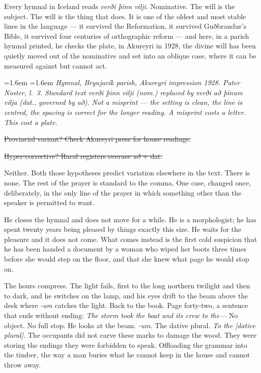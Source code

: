 \documentclass[11pt,oneside]{book}
\newenvironment{fieldnote}
  {\par\vspace{0.9em}\begingroup
   \leftskip=1.6em \rightskip=1.6em
   \fontsize{10}{12.4}\selectfont\itshape
   \setlength{\parindent}{0pt}\noindent\ignorespaces}
  {\par\endgroup\vspace{0.9em}\noindent\ignorespaces}
\newcommand{\struck}[1]{\sout{#1}}
\begin{document}
Every hymnal in Iceland reads \emph{verði þinn vilji.} Nominative. The
will is the subject. The will is the thing that does. It is one of the
oldest and most stable lines in the language --- it survived the
Reformation, it survived Guðbrandur's Bible, it survived four centuries
of orthographic reform --- and here, in a parish hymnal printed, he
checks the plate, in Akureyri in 1928, the divine will has been quietly
moved out of the nominative and set into an oblique case, where it can
be measured against but cannot act.

\begin{fieldnote}
Hymnal, Brynjavík parish, Akureyri impression 1928. Pater Noster, l.~3.
Standard text \emph{verði þinn vilji} (nom.) replaced by \emph{verði að
þínum vilja} (dat., governed by \emph{að}). Not a misprint --- the
setting is clean, the line is centred, the spacing is correct for the
longer reading. A misprint costs a letter. This cost a plate.

\struck{Provincial variant? Check Akureyri press for house readings.}

\struck{Hyper-corrective? Rural registers overuse \emph{að} + dat.}

Neither. Both those hypotheses predict variation elsewhere in the text.
There is none. The rest of the prayer is standard to the comma. One
case, changed once, deliberately, in the only line of the prayer in
which something other than the speaker is permitted to want.
\end{fieldnote}

He closes the hymnal and does not move for a while. He is a
morphologist; he has spent twenty years being pleased by things exactly
this size. He waits for the pleasure and it does not come. What comes
instead is the first cold suspicion that he has been handed a
document by a woman who wiped her boots three times before she would
step on the floor, and that she knew what page he would stop on.

The hours compress. The light fails, first to the long northern twilight
and then to dark, and he switches on the lamp, and his eyes drift to the
beam above the desk where \emph{-um} catches the light. Back to the
book. Page forty-two, a sentence that ends without ending: \emph{The
storm took the boat and its crew to the---} No object. No full stop. He
looks at the beam. \emph{-um.} The dative plural. \emph{To the {[}dative
plural{]}.} The occupants did not carve these marks to damage the wood.
They were storing the endings they were forbidden to speak. Offloading
the grammar into the timber, the way a man buries what he cannot keep in
the house and cannot throw away.
\end{document}
